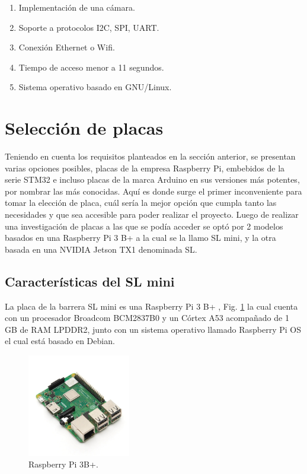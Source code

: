 \begin{enumerate}
    \item Implementación de una cámara.
    \item Soporte a protocolos I2C, SPI, UART.
    \item Conexión Ethernet o Wifi.
    \item Tiempo de acceso menor a 11 segundos.
    \item Sistema operativo basado en GNU/Linux.
\end{enumerate}


\section{Selección de placas}

Teniendo en cuenta los requisitos planteados en la sección anterior, se presentan varias opciones posibles,
placas de la empresa Raspberry Pi, embebidos de la serie STM32 e incluso placas de la marca Arduino en sus versiones más potentes, por nombrar las más conocidas.
Aquí es donde surge el primer inconveniente para tomar la elección de placa,
cuál sería la mejor opción que cumpla tanto las necesidades y que sea accesible para poder realizar el proyecto.
Luego de realizar una investigación de placas a las que se podía acceder se optó por 2 modelos basados en una Raspberry Pi 3 B+ a la cual se la llamo SL mini, y la otra basada en una NVIDIA Jetson TX1 denominada SL.

\subsection{Características del SL mini}

La placa de la barrera SL mini es una Raspberry Pi 3 B+ \cite{noauthor_documentacion_nodate-2}, Fig. \ref{fig:raspberry} la cual cuenta con un procesador
Broadcom BCM2837B0 y un Córtex A53 acompañado de 1 GB de RAM LPDDR2, junto con un sistema operativo llamado Raspberry Pi OS el cual está basado en Debian.

\begin{figure}
    \centering
    \includegraphics[width=0.4\textwidth]{imgs/Raspberry-pi3b+.jpg}
    \caption{Raspberry Pi 3B+.}
    \label{fig:raspberry}
\end{figure}


